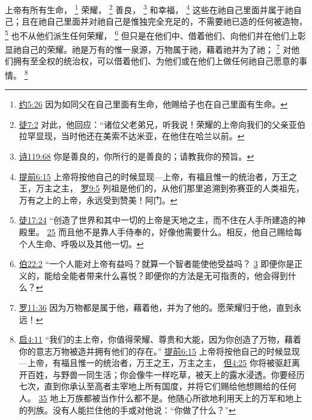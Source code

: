 \documentclass[12pt, a4paper, oneside]{ctexart}
\newcounter{parnum}[section]
\newcommand{\N}{%
   \noindent\refstepcounter{parnum}%
    \makebox[\parindent][l]{\textbf{\arabic{parnum}.}}}
\begin{document}
\N 上帝有所有生命，
	\footnote {
		\href{https://biblehub.com/john/5-26.htm}{约5:26} 因为如同父在自己里面有生命，他赐给子也在自己里面有生命。
	}
	荣耀，
	\footnote {
		\href{https://biblehub.com/acts/7-2.htm}{徒7:2} 对此，他回应：“诸位父老弟兄，听我说！荣耀的上帝向我们的父亲亚伯拉罕显现，当时他还在美索不达米亚，在他住在哈兰以前。
	}
	善良，
	\footnote {
		\href{https://biblehub.com/psalms/119-68.htm}{诗119:68} 你是善良的，你所行的是善良的；请教我你的预旨。
	}
	和幸福，
	\footnote {
		\href{https://biblehub.com/1_timothy/6-15.htm}{提前6:15} 上帝将按他自己的时候显现---上帝，有福且惟一的统治者，万王之王，万主之主，
		\href{https://biblehub.com/romans/9-5.htm}{罗9:5} 列祖是他们的，从他们那里追溯到弥赛亚的人类祖先，万有之上的上帝，永远受到赞美！阿门。
	}
	这些在祂自己里面并属于祂自己；且在祂自己里面并对祂自己是惟独完全充足的，不需要祂已造的任何被造物，
	\footnote {
		\href{https://biblehub.com/acts/17-24.htm}{徒17:24} “创造了世界和其中一切的上帝是天地之主，而不住在人手所建造的神殿里。
		\href{https://biblehub.com/acts/17-25.htm}{25} 而且他不是靠人手侍奉的，好像他需要什么。相反，他自己赐给每个人生命、呼吸以及其他一切。
	}
	也不从他们派生任何荣耀，
	\footnote {
		\href{https://biblehub.com/job/22-2.htm}{伯22:2} “一个人能对上帝有益吗？就算一个智者能使他受益吗？
		\href{https://biblehub.com/job/22-3.htm}{3} 即便你是正义的，能给全能者带来什么喜悦？即便你的方法是无可指责的，他会得到什么？
	}
	但只是在他们中、借着他们、向他们并在他们上彰显祂自己的荣耀。祂是万有的惟一泉源，万物属于祂，藉着祂并为了祂；
	\footnote {
		\href{https://biblehub.com/romans/11-36.htm}{罗11:36} 因为万物都是属于他，藉着他，并为了他的。愿荣耀归于他，直到永远！
	}
	对他们拥有至全权的统治权，可以借着他们、为他们或在他们上做任何祂自己愿意的事情。
	\footnote {
		\href{https://biblehub.com/revelation/4-11.htm}{启4:11} “我们的主上帝，你值得荣耀、尊贵和大能，因为你创造了万物，藉着你的意志万物被造并拥有他们的存在。”
		\href{https://biblehub.com/1_timothy/6-15.htm}{提前6:15} 上帝将按他自己的时候显现---上帝，有福且惟一的统治者，万王之王，万主之主，
		\href{https://biblehub.com/daniel/4-25.htm}{但4:25} 你将被驱赶离开百姓，与野兽一同生活；你会像牛一样吃草，被天上的露水浸透。你要经历七次，直到你承认至高者主宰地上所有国度，并将它们赐给他想赐给的任何人。
		\href{https://biblehub.com/daniel/4-35.htm}{35} 地上万族都被当作什么都不是。他随心所欲地利用天上的万军和地上的列族。没有人能拦住他的手或对他说：“你做了什么？”
	}
\end{document}
